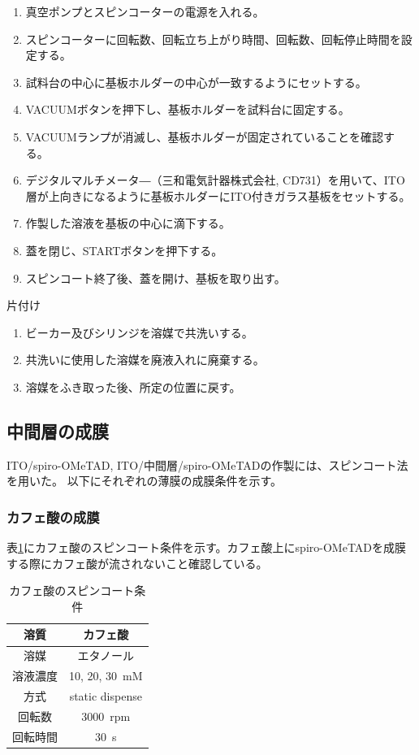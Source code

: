 	\begin{enumerate}
		\item 真空ポンプとスピンコーターの電源を入れる。
		\item スピンコーターに回転数、回転立ち上がり時間、回転数、回転停止時間を設定する。
		\item 試料台の中心に基板ホルダーの中心が一致するようにセットする。
		\item VACUUMボタンを押下し、基板ホルダーを試料台に固定する。
		\item VACUUMランプが消滅し、基板ホルダーが固定されていることを確認する。
		\item デジタルマルチメータ―（三和電気計器株式会社, CD731）を用いて、ITO層が上向きになるように基板ホルダーにITO付きガラス基板をセットする。
		\item 作製した溶液を基板の中心に滴下する。
		\item 蓋を閉じ、STARTボタンを押下する。
		\item スピンコート終了後、蓋を開け、基板を取り出す。
	\end{enumerate}
	片付け
	\begin{enumerate}
		\item ビーカー及びシリンジを溶媒で共洗いする。
		\item 共洗いに使用した溶媒を廃液入れに廃棄する。
		\item 溶媒をふき取った後、所定の位置に戻す。
	\end{enumerate}
	
\subsection{中間層の成膜}
ITO/spiro-OMeTAD, ITO/中間層/spiro-OMeTADの作製には、スピンコート法を用いた。
以下にそれぞれの薄膜の成膜条件を示す。
　\subsubsection{カフェ酸の成膜}%
表\ref{Cafeの成膜条件}にカフェ酸のスピンコート条件を示す。カフェ酸上にspiro-OMeTADを成膜する際にカフェ酸が流されないこと確認している。\cite{片山壮介_卒}

  \begin{table}[H] 
	  \centering 
	  \caption{カフェ酸のスピンコート条件} 
	  \label{Cafeの成膜条件} 
	  \begin{tabular}{cc} 
	  \hline 
	  溶質&カフェ酸\\\hline 
	  溶媒&エタノール\\\hline 
	  溶液濃度&10, 20, \SI{30}{mM}\\\hline
      方式&static dispense\\\hline 
	  回転数&\SI{3000}{rpm}\\\hline 
	  回転時間&\SI{30}{s}\\\hline
  \end{tabular} 
  \end{table}


